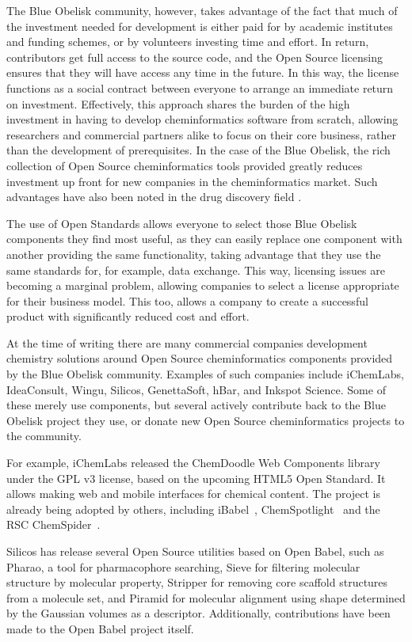 \documentclass[10pt]{bmc_article}
\newenvironment{bmcformat}{\fussy\setboolean{publ}{true}}{\fussy}
\begin{document}
\begin{bmcformat}
The Blue Obelisk community, however, takes advantage of the fact that much of the investment needed
for development is either paid for by academic institutes and funding
schemes, or by
volunteers investing time and effort. In return, contributors get full
access to the source code, and the Open Source licensing ensures
that they will have access any time in the future. In this way, the
license functions as a social
contract between everyone to arrange an immediate return on investment. Effectively,
this approach shares the burden of the high investment in having to develop cheminformatics
software from scratch, allowing researchers and commercial partners alike to focus
on their core business, rather than the development of prerequisites.
In the case of the Blue Obelisk, the rich
collection of Open Source cheminformatics tools provided
greatly reduces investment up front for new companies in the
cheminformatics market. Such advantages have also been noted in the
drug discovery
field \cite{DeLano:2005uq}\cite{Munos:2006vn}\cite{Geldenhuys:2006kx}.

The use of Open Standards allows everyone to select those Blue Obelisk components
they find most useful, as they can easily replace one component with another providing
the same functionality, taking advantage that they use the same standards for,
for example, data exchange. This way, licensing issues are becoming a marginal
problem, allowing companies to select a license appropriate for their business
model. This too, allows a company to create a successful product with significantly
reduced cost and effort.

At the time of writing there are many commercial companies development chemistry
solutions around Open Source cheminformatics components provided by the Blue Obelisk
community. Examples of such companies include iChemLabs, IdeaConsult, Wingu, Silicos,
GenettaSoft, hBar, and Inkspot Science. Some of these merely use components, but several
actively contribute back to the Blue Obelisk project they use, or donate new
Open Source cheminformatics projects to the community.

For example, iChemLabs released the ChemDoodle Web Components library under the GPL v3
license, based on the upcoming HTML5 Open Standard. It allows making web and mobile
interfaces for chemical content. The project is already being adopted by others,
including iBabel~\cite{iBabel}, ChemSpotlight~\cite{chemspotlight} and the RSC ChemSpider~\cite{chemspider_chemdoodle}.

Silicos has release several Open Source utilities based on
Open Babel, such as Pharao, a tool for pharmacophore searching,
Sieve for filtering molecular structure by molecular property,
Stripper for removing core scaffold structures from a molecule
set, and Piramid for molecular alignment using shape determined
by the Gaussian volumes as a descriptor. Additionally,
contributions have been made to the Open Babel project itself.


\end{bmcformat}
\end{document}
